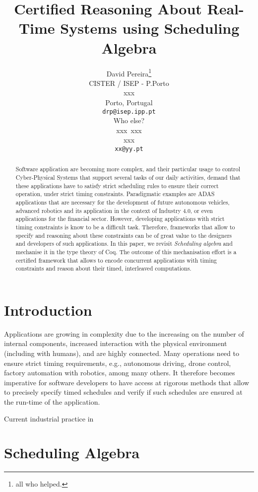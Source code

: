 \documentclass{article}
\title{Certified Reasoning About Real-Time Systems using Scheduling Algebra}
\author{
  David Pereira\thanks{all who helped.} \\
  CISTER / ISEP - P.Porto\\
  xxx\\
  Porto, Portugal \\
  \texttt{drp@isep.ipp.pt} \\
   \And
 Who else?\\
  xxx\
  xxx\\
  xxx \\
  \texttt{xx@yy.pt} \\
}
\begin{document}
\maketitle

\begin{abstract}
Software application are becoming more complex, and their particular usage to control Cyber-Physical Systems that support several tasks of our daily activities, demand that these applications have to satisfy strict scheduling rules to ensure their correct operation, under strict timing constraints. Paradigmatic examples are ADAS applications that are necessary for the development of future autonomous vehicles, advanced robotics and its application in the context of Industry 4.0, or even applications for the financial sector. However, developing applications with strict timing constraints is know to be a difficult task. Therefore, frameworks that allow to specify and reasoning about these constraints can be of great value to the designers and developers of such applications.  In this paper, we revisit {\em Scheduling algebra} and mechanise it in the type theory of Coq. The outcome of this mechanisation effort is a certified framework that allows to encode concurrent applications with timing constraints and reason about their timed, interleaved computations.   
\end{abstract}




\section{Introduction}

Applications are growing in complexity due to the increasing on the number of internal components, increased interaction with the physical environment (including with humans), and are highly connected. Many operations need to ensure strict timing requirements, e.g., autonomous driving, drone control, factory automation with robotics, among many others. It therefore becomes imperative for software developers to have access at rigorous methods that allow to precisely specify timed schedules and verify if such schedules are ensured at the run-time of the application. 

Current industrial practice in


\section{Scheduling Algebra}
\label{sec:1}
\end{document}
